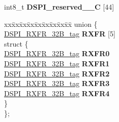 \begin{DoxyCompactItemize}
\begin{tabbing}
\end{tabbing}\item 
\mbox{\label{structDSPI__tag_a136444a8f751e265eb64e88ffa3047ed}} 
int8\+\_\+t {\bfseries D\+S\+P\+I\+\_\+reserved\+\_\+\_\+C} \mbox{[}44\mbox{]}
\item 
\mbox{\label{structDSPI__tag_a5729fe98b2deb8cb7e258f1ae5fef888}} 
\begin{tabbing}
xx\=xx\=xx\=xx\=xx\=xx\=xx\=xx\=xx\=\kill
union \{\\
\>\mbox{\hyperlink{unionDSPI__RXFR__32B__tag}{DSPI\_RXFR\_32B\_tag}} {\bfseries RXFR} \mbox{[}5\mbox{]}\\
\mbox{\label{unionDSPI__tag_1_1_0D2319_af3e11f5f4d11f93ce9f9f635af4a7df7}} 
\>struct \{\\
\>\>\mbox{\hyperlink{unionDSPI__RXFR__32B__tag}{DSPI\_RXFR\_32B\_tag}} {\bfseries RXFR0}\\
\>\>\mbox{\hyperlink{unionDSPI__RXFR__32B__tag}{DSPI\_RXFR\_32B\_tag}} {\bfseries RXFR1}\\
\>\>\mbox{\hyperlink{unionDSPI__RXFR__32B__tag}{DSPI\_RXFR\_32B\_tag}} {\bfseries RXFR2}\\
\>\>\mbox{\hyperlink{unionDSPI__RXFR__32B__tag}{DSPI\_RXFR\_32B\_tag}} {\bfseries RXFR3}\\
\>\>\mbox{\hyperlink{unionDSPI__RXFR__32B__tag}{DSPI\_RXFR\_32B\_tag}} {\bfseries RXFR4}\\
\>\} \\
\}; \\


\end{tabbing}
\end{DoxyCompactItemize}
